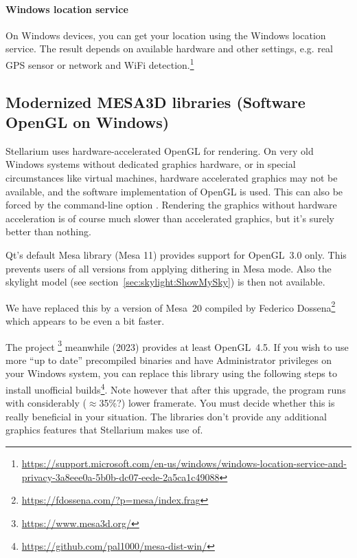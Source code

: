 \paragraph{Windows location service} On Windows devices, you can get your location
using the Windows location service. The result depends on available
hardware and other settings, e.g. real GPS sensor or network and WiFi
detection.\footnote{\url{https://support.microsoft.com/en-us/windows/windows-location-service-and-privacy-3a8eee0a-5b0b-dc07-eede-2a5ca1c49088}}


\subsection{Modernized MESA3D libraries (Software OpenGL on Windows)}
\label{sec:ExtraData:Mesa}

Stellarium uses hardware-accelerated OpenGL for rendering. On very old Windows systems without dedicated graphics hardware, 
or in special circumstances like virtual machines, hardware accelerated graphics may not be available, 
and the  software implementation of OpenGL is used. This can also be forced by the command-line option . 
Rendering the graphics without hardware acceleration is of course much slower than accelerated graphics, but it's surely better than nothing.

Qt's default Mesa library (Mesa 11) provides support for OpenGL~3.0 only. This prevents users of all versions from applying dithering in Mesa mode. 
Also the  skylight model (see section~\ref{sec:skylight:ShowMySky}) is then not available.

We have replaced this by a version of Mesa~20 compiled by Federico Dossena\footnote{\url{https://fdossena.com/?p=mesa/index.frag}} which appears to be even a bit faster.

The  project \footnote{\url{https://www.mesa3d.org/}} meanwhile (2023) provides at least OpenGL~4.5. 
If you wish to use more ``up to date'' precompiled binaries and have Administrator privileges on your Windows system, 
you can replace this library using the following steps to install unofficial builds\footnote{\url{https://github.com/pal1000/mesa-dist-win/}}. 
Note however that after this upgrade, the program runs with considerably ($\approx$35\%?) lower framerate. 
You must decide whether this is really beneficial in your situation. The libraries don't provide any additional graphics features that Stellarium makes use of.

